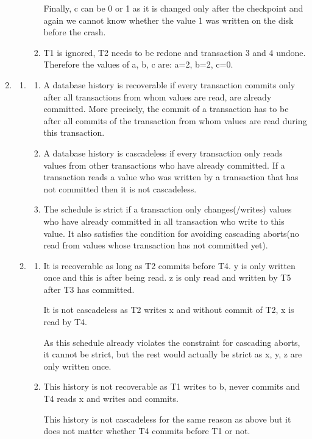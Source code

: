 \documentclass[12pt]{extarticle}
\begin{document}
\begin{flushleft}
\begin{enumerate}[label=\textbf{\Alph*.}]
\begin{enumerate}[label=\arabic*.]
\begin{enumerate}[label=(\alph*)]
Finally, c can be 0 or 1 as it is changed only after the checkpoint and again we cannot know whether the value 1 was written on the disk before the crash. 
\item T1 is ignored, T2 needs to be redone and transaction 3 and 4 undone. Therefore the values of a, b, c are: a=2, b=2, c=0. 
\end{enumerate}
\end{enumerate}
\item 
\begin{enumerate}[label=\arabic*.]
\item \begin{enumerate}[label=(\alph*)]
\item A database history is recoverable if every transaction commits only after all transactions from whom values are read, are already committed. More precisely, the commit of a transaction has to be after all commits of the transaction from whom values are read during this transaction. 
\item A database history is cascadeless if every transaction only reads values from other transactions who have already committed. If a transaction reads a value who was written by a transaction that has not committed then it is not cascadeless.
\item The schedule is strict if a transaction only changes(/writes) values who have already committed in all transaction who write to this value. It also satisfies the condition for avoiding cascading aborts(no read from values whose transaction has not committed yet).
\end{enumerate}
\item \begin{enumerate}[label=(\alph*)]
\item It is recoverable as long as T2 commits before T4. y is only written once and this is after being read. z is only read and written by T5 after T3 has committed. 

It is not cascadeless as T2 writes x and without commit of T2, x is read by T4. 

As this schedule already violates the constraint for cascading aborts, it cannot be strict, but the rest would actually be strict as x, y, z are only written once.
\item This history is not recoverable as T1 writes to b, never commits and T4 reads x and writes and commits. 

This history is not cascadeless for the same reason as above but it does not matter whether T4 commits before T1 or not. 


\end{enumerate}
\end{enumerate}
\end{enumerate}
\end{flushleft}
\end{document}
